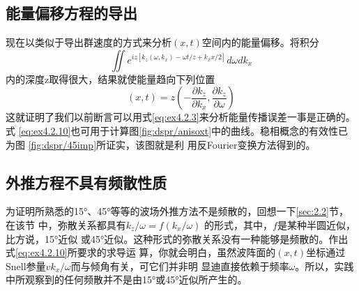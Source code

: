\subsection{能量偏移方程的导出}
\label{sec:4.2.5}

现在以类似于导出群速度的方式来分析$(x,t)$空间内的能量偏移。将积分
\begin{equation}
\iint e^{iz[k_z(\omega,k_x)-\omega t/z+k_xx/2]}d\omega dk_x
\label{eq:ex4.2.9}
\end{equation}
内的深度z取得很大，结果就使能量趋向下列位置
\begin{equation}
(x,t)=z(-\frac{\partial k_z}{\partial k_x},\frac{\partial k_z}{\partial \omega})
\label{eq:ex4.2.10}
\end{equation}
这就证明了我们以前断言可以用式\ref{eq:ex4.2.3}来分析能量传播误差一事是正确的。式
\ref{eq:ex4.2.10}也可用于计算图\ref{fig:dspr/anisoxt}中的曲线。稳相概念的有效性已为图
\ref{fig:dspr/45imp}所证实，该图就是利
用反Fourier变换方法得到的。
%
\subsection{外推方程不具有频散性质}
\label{sec:4.2.6}

为证明所熟悉的15°、45°等等的波场外推方法不是频散的，回想一下\ref{sec:2.2}节，在该节
中，弥散关系都具有$k_z/\omega=f(k_x/\omega)$
的形式，其中，$f$是某种半圆近似，比方说，15°近似
或45°近似。这种形式的弥散关系没有一种能够是频散的。作出式\ref{eq:ex4.2.10}所要求的求导运
算，你就会明白，虽然波阵面的$(x,t)$坐标通过Snell参量$vk_x/\omega$而与倾角有关，可它们并非明
显迪直接依赖于频率$\omega$。所以，实践中所观察到的任何频散并不是由15°或45°近似所产生的。

